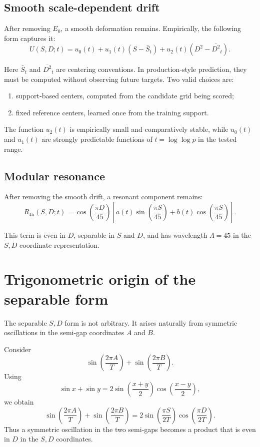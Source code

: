 \documentclass[11pt]{article}
\begin{document}
\subsection{Smooth scale-dependent drift}

After removing \(E_0\), a smooth deformation remains. Empirically, the following form captures it:
\[
U(S,D;t)=u_0(t)+u_1(t)(S-\bar S_t)+u_2(t)(D^2-\overline{D^2}_t).
\]

Here \(\bar S_t\) and \(\overline{D^2}_t\) are centering conventions. In production-style prediction, they must be computed without observing future targets. Two valid choices are:
\begin{enumerate}[label=\arabic*.]
\item support-based centers, computed from the candidate grid being scored;
\item fixed reference centers, learned once from the training support.
\end{enumerate}

The function \(u_2(t)\) is empirically small and comparatively stable, while \(u_0(t)\) and \(u_1(t)\) are strongly predictable functions of \(t=\log\log p\) in the tested range.

\subsection{Modular resonance}

After removing the smooth drift, a resonant component remains:
\[
R_{45}(S,D;t)
=
\cos\left(\frac{\pi D}{45}\right)
\left[
a(t)\sin\left(\frac{\pi S}{45}\right)
+
b(t)\cos\left(\frac{\pi S}{45}\right)
\right].
\]

This term is even in \(D\), separable in \(S\) and \(D\), and has wavelength \(\Lambda=45\) in the \(S,D\) coordinate representation.

\section{Trigonometric origin of the separable form}

The separable \(S,D\) form is not arbitrary. It arises naturally from symmetric oscillations in the semi-gap coordinates \(A\) and \(B\).

Consider
\[
\sin\left(\frac{2\pi A}{T}\right)+\sin\left(\frac{2\pi B}{T}\right).
\]
Using
\[
\sin x+\sin y=2\sin\left(\frac{x+y}{2}\right)\cos\left(\frac{x-y}{2}\right),
\]
we obtain
\[
\sin\left(\frac{2\pi A}{T}\right)
+
\sin\left(\frac{2\pi B}{T}\right)
=
2\sin\left(\frac{\pi S}{2T}\right)
\cos\left(\frac{\pi D}{2T}\right).
\]
Thus a symmetric oscillation in the two semi-gaps becomes a product that is even in \(D\) in the \(S,D\) coordinates.
\end{document}
